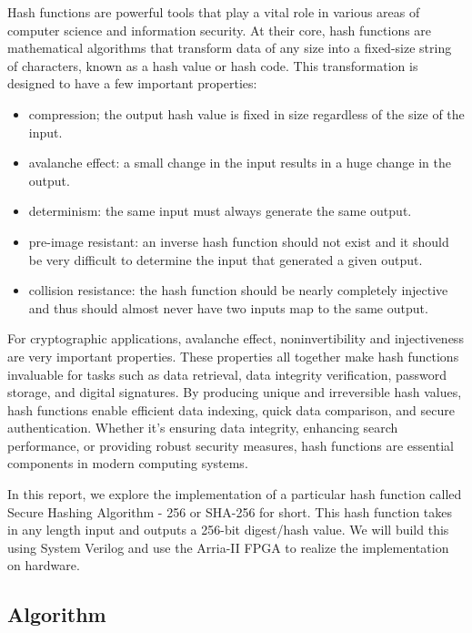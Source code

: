 \documentclass{article}
\begin{document}
Hash functions are powerful tools that play a vital role in various areas of computer science and information security. At their core, hash functions are mathematical algorithms that transform data of any size into a fixed-size string of characters, known as a hash value or hash code. This transformation is designed to have a few important properties:
\begin{itemize} %
  \item compression; the output hash value is fixed in size regardless of the size of the input.
  \item avalanche effect: a small change in the input results in a huge change in the output.
  \item determinism: the same input must always generate the same output.
  \item pre-image resistant: an inverse hash function should not exist and it should be very difficult to determine the input that generated a given output.
  \item collision resistance: the hash function should be nearly completely injective and thus should almost never have two inputs map to the same output.
\end{itemize}
For cryptographic applications, avalanche effect, noninvertibility and injectiveness are very important properties. These properties all together make hash functions invaluable for tasks such as data retrieval, data integrity verification, password storage, and digital signatures. By producing unique and irreversible hash values, hash functions enable efficient data indexing, quick data comparison, and secure authentication. Whether it's ensuring data integrity, enhancing search performance, or providing robust security measures, hash functions are essential components in modern computing systems.

In this report, we explore the implementation of a particular hash function called Secure Hashing Algorithm - 256 or SHA-256 for short. This hash function takes in any length input and outputs a 256-bit digest/hash value. We will build this using System Verilog and use the Arria-II FPGA to realize the implementation on hardware.

\subsection{Algorithm}
\end{document}

